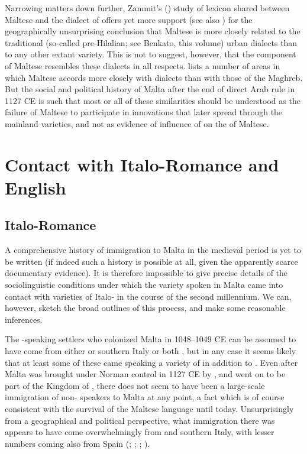 \documentclass[output=paper]{langsci/langscibook}
\begin{document}
Narrowing matters down further, Zammit's (\citeyear{zammit2014}) study of lexicon shared between Maltese and the  dialect of  offers yet more support (see also \citealt{Vanhove1998}) for the geographically unsurprising conclusion that Maltese is more closely related to the traditional (so-called pre-Hilalian; see Benkato, this volume) urban  dialects than to any other extant  variety. This is not to suggest, however, that the  component of Maltese resembles these dialects in all respects. \cite{Borg1996} lists a number of areas in which Maltese accords more closely with   dialects than with those of the Maghreb. But the social and political history of Malta after the end of direct Arab rule in 1127 CE is such that most or all of these similarities should be understood as the failure of Maltese to participate in innovations that later spread through the mainland  varieties, and not as evidence of influence of   on the  of Maltese.

\section{Contact with Italo-Romance and English}
\subsection{Italo-Romance}

A comprehensive history of immigration to Malta in the medieval period is yet to be written (if indeed such a history is possible at all, given the apparently scarce documentary evidence). It is therefore impossible to give precise details of the sociolinguistic conditions under which the  variety spoken in Malta came into contact with varieties of Italo- in the course of the second millennium. We can, however, sketch the broad outlines of this process, and make some reasonable inferences.

The -speaking settlers who colonized Malta in 1048--1049 CE can be assumed to have come from either  or southern Italy or both \citep[22]{brincat1995}, but in any case it seems likely that at least some of these came speaking a variety of  in addition to . Even after Malta was brought under Norman control in 1127 CE by , and went on to be part of the Kingdom of , there does not seem to have been a large-scale immigration of non- speakers to Malta at any point, a fact which is of course consistent with the survival of the Maltese language until today. Unsurprisingly from a geographical and political perspective, what immigration there was appears to have come overwhelmingly from  and southern Italy, with lesser numbers coming also from Spain (\citealt[134, 289]{ballou1893}; \citealt[43--46]{blouet1967}; \citealt{fiorini1986}; \citealt[26--32]{goodwin2002}).
\end{document}
